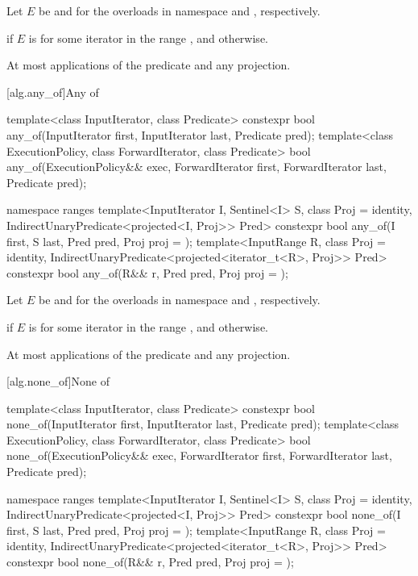 \begin{itemdescr}
\pnum
Let $E$ be  and 
for the overloads in namespace  and , respectively.

\pnum
\returns
{} if $E$ is 
for some iterator  in the range , and
 otherwise.

\pnum
\complexity
At most  applications of the predicate and any projection.
\end{itemdescr}

[alg.any_of]{Any of}

%
\begin{itemdecl}
template<class InputIterator, class Predicate>
  constexpr bool any_of(InputIterator first, InputIterator last, Predicate pred);
template<class ExecutionPolicy, class ForwardIterator, class Predicate>
  bool any_of(ExecutionPolicy&& exec, ForwardIterator first, ForwardIterator last,
              Predicate pred);

namespace ranges {
  template<InputIterator I, Sentinel<I> S, class Proj = identity,
           IndirectUnaryPredicate<projected<I, Proj>> Pred>
    constexpr bool any_of(I first, S last, Pred pred, Proj proj = {});
  template<InputRange R, class Proj = identity,
           IndirectUnaryPredicate<projected<iterator_t<R>, Proj>> Pred>
    constexpr bool any_of(R&& r, Pred pred, Proj proj = {});
}
\end{itemdecl}

\begin{itemdescr}
\pnum
Let $E$ be  and 
for the overloads in namespace  and , respectively.

\pnum
\returns
{} if $E$ is  for some iterator 
in the range , and  otherwise.

\pnum
\complexity At most  applications of the predicate
and any projection.
\end{itemdescr}

[alg.none_of]{None of}

%
\begin{itemdecl}
template<class InputIterator, class Predicate>
  constexpr bool none_of(InputIterator first, InputIterator last, Predicate pred);
template<class ExecutionPolicy, class ForwardIterator, class Predicate>
  bool none_of(ExecutionPolicy&& exec, ForwardIterator first, ForwardIterator last,
               Predicate pred);

namespace ranges {
  template<InputIterator I, Sentinel<I> S, class Proj = identity,
           IndirectUnaryPredicate<projected<I, Proj>> Pred>
    constexpr bool none_of(I first, S last, Pred pred, Proj proj = {});
  template<InputRange R, class Proj = identity,
           IndirectUnaryPredicate<projected<iterator_t<R>, Proj>> Pred>
    constexpr bool none_of(R&& r, Pred pred, Proj proj = {});
}
\end{itemdecl}

